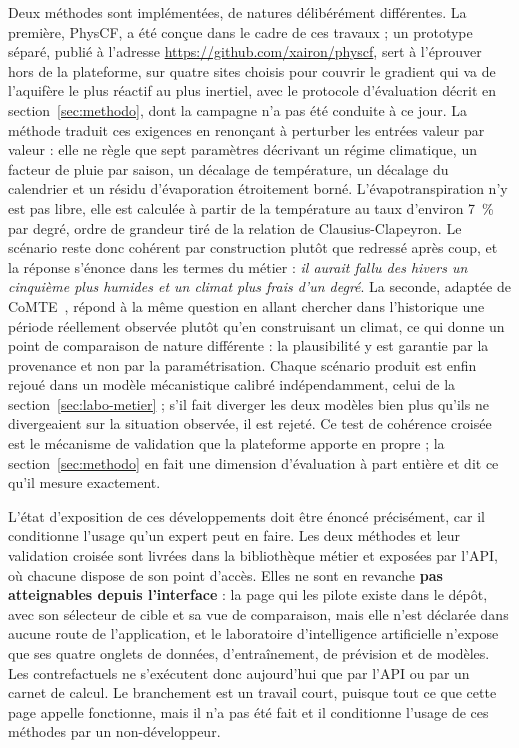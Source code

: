 Deux méthodes sont implémentées, de natures délibérément différentes. La première, PhysCF, a été conçue dans le cadre de ces travaux ; un prototype séparé, publié à l'adresse \url{https://github.com/xairon/physcf}, sert à l'éprouver hors de la plateforme, sur quatre sites choisis pour couvrir le gradient qui va de l'aquifère le plus réactif au plus inertiel, avec le protocole d'évaluation décrit en section~\ref{sec:methodo}, dont la campagne n'a pas été conduite à ce jour. La méthode traduit ces exigences en renonçant à perturber les entrées valeur par valeur : elle ne règle que sept paramètres décrivant un régime climatique, un facteur de pluie par saison, un décalage de température, un décalage du calendrier et un résidu d'évaporation étroitement borné. L'évapotranspiration n'y est pas libre, elle est calculée à partir de la température au taux d'environ \SI{7}{\percent} par degré, ordre de grandeur tiré de la relation de Clausius-Clapeyron. Le scénario reste donc cohérent par construction plutôt que redressé après coup, et la réponse s'énonce dans les termes du métier : \emph{il aurait fallu des hivers un cinquième plus humides et un climat plus frais d'un degré}. La seconde, adaptée de CoMTE~\cite{ates2021comte}, répond à la même question en allant chercher dans l'historique une période réellement observée plutôt qu'en construisant un climat, ce qui donne un point de comparaison de nature différente : la plausibilité y est garantie par la provenance et non par la paramétrisation. Chaque scénario produit est enfin rejoué dans un modèle mécanistique calibré indépendamment, celui de la section~\ref{sec:labo-metier} ; s'il fait diverger les deux modèles bien plus qu'ils ne divergeaient sur la situation observée, il est rejeté. Ce test de cohérence croisée est le mécanisme de validation que la plateforme apporte en propre ; la section~\ref{sec:methodo} en fait une dimension d'évaluation à part entière et dit ce qu'il mesure exactement.

L'état d'exposition de ces développements doit être énoncé précisément, car il conditionne l'usage qu'un expert peut en faire. Les deux méthodes et leur validation croisée sont livrées dans la bibliothèque métier et exposées par l'API, où chacune dispose de son point d'accès. Elles ne sont en revanche \textbf{pas atteignables depuis l'interface} : la page qui les pilote existe dans le dépôt, avec son sélecteur de cible et sa vue de comparaison, mais elle n'est déclarée dans aucune route de l'application, et le laboratoire d'intelligence artificielle n'expose que ses quatre onglets de données, d'entraînement, de prévision et de modèles. Les contrefactuels ne s'exécutent donc aujourd'hui que par l'API ou par un carnet de calcul. Le branchement est un travail court, puisque tout ce que cette page appelle fonctionne, mais il n'a pas été fait et il conditionne l'usage de ces méthodes par un non-développeur.

